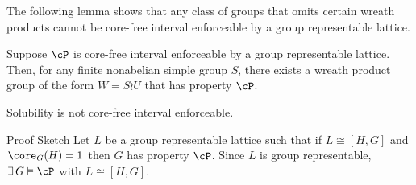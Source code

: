 \begin{frame}[label=IEPropsLemma2]{}
The following lemma shows that 
any class of groups that omits certain wreath products cannot be core-free
interval enforceable by a group representable lattice. 
\vskip4mm
\begin{lemma}
Suppose $\cP$ is core-free interval enforceable by a group
representable lattice.   
Then, for any finite nonabelian simple group $S$, there exists a wreath product group
of the form $W = S\wr U$ that has property $\cP$. 
\end{lemma}
\vskip4mm
\begin{corollary}
Solubility is not core-free interval enforceable.
\end{corollary}
\end{frame}

\begin{frame}[label=IEPropsLemma2]{}
\alert{Proof Sketch}
\vskip2mm
  Let $L$ be a group representable lattice such that if $L\cong [H,G]$ and
  $\core_G(H)=1$ then $G$ has property $\cP$.  
\vskip4mm
  Since $L$ is group representable, $\exists\, G \vDash \cP$ with $L
  \cong [H,G]$. 
\vskip4mm
\end{frame}

